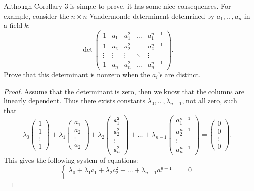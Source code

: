 \begin{exercise}{2}
Although Corollary $3$ is simple to prove, it has some nice consequences. For example, consider the $n\times n$ Vandermonde determinant detemrined by $a_1,...,a_n$ in a field $k$:
$$\det\left(\begin{array}{ccccc}
1 & a_1 & a_1^2 & \hdots & a_1^{n-1}\\
1 & a_2 & a_2^2 & \hdots & a_2^{n-1}\\
\vdots & \vdots & \vdots & \ddots & \vdots\\
1 & a_n & a_n^2 & \hdots & a_n^{n-1}
\end{array}\right).$$
Prove that this determinant is nonzero when the $a_i$'s are distinct.
\end{exercise}
\begin{proof}
    Assume that the determinant is zero, then we know that the columns are linearly dependent. Thus there exists constants $\lambda_0,...,\lambda_{n-1}$, not all zero, such that
    $$\lambda_0\left(\begin{array}{c} 1\\ 1\\ \vdots\\ 1\end{array}\right) + \lambda_1\left(\begin{array}{c} a_1\\ a_2\\ \vdots\\ a_2\end{array}\right) + \lambda_2\left(\begin{array}{c} a_1^2\\ a_2^2\\ \vdots\\ a_n^2\end{array}\right) + \hdots + \lambda_{n-1}\left(\begin{array}{c} a_1^{n-1}\\ a_2^{n-1}\\ \vdots\\ a_n^{n-1}\end{array}\right) = \left(\begin{array}{c} 0\\ 0\\ \vdots\\ 0\end{array}\right).$$
    This gives the following system of equations:
    $$\left\{\begin{array}{lll}
    \lambda_0 + \lambda_1 a_1 + \lambda_2 a_2^2 + \hdots + \lambda_{n-1} a_1^{n-1} & = & 0\\

\end{array}$$
\end{proof}
